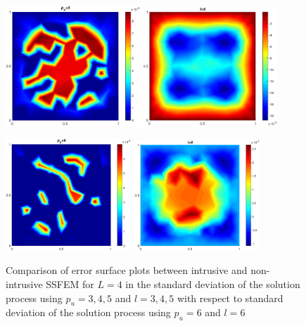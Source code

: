 \documentclass[letter,1p,11pt,oneside,onecolumn,sort&compress]{elsarticle}
\begin{document}
\begin{figure}[htbp]
 \includegraphics[width=0.45\textwidth,height=0.27\textheight]{plots/errorSurf_L4p5.eps}
 \includegraphics[width=0.45\textwidth,height=0.27\textheight]{plots/errorSurf_L4l5.eps}

  \includegraphics[width=0.42\textwidth,height=0.24\textheight]{plots/errorSurf_L4p6.eps}
  \includegraphics[width=0.42\textwidth,height=0.24\textheight]{plots/errorSurf_L4l6.eps}
 \caption{Comparison of error surface plots between intrusive and non-intrusive SSFEM for $L=4$ in the standard deviation of the solution process using $p_u=3,4,5$ and $l=3,4,5$ with respect to standard deviation of the solution process using $p_u=6$ and $l=6$}
 \label{fig:SD_errorSurf}
\end{figure}
\end{document}
